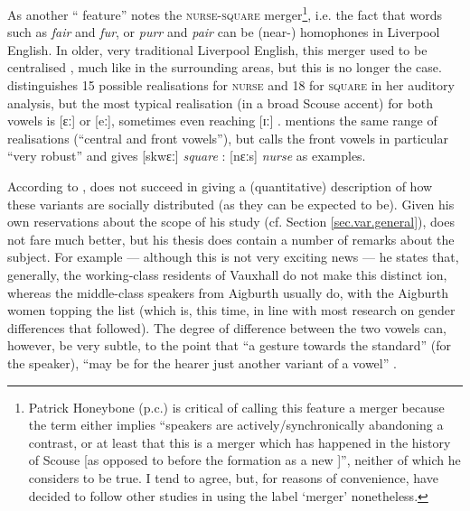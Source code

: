 As another `` feature'' \citet[72]{trudgill1999} notes the \textsc{nurse}-\textsc{square} merger\footnote{Patrick Honeybone (p.c.) is critical of calling this feature a merger because the term either implies \enquote{speakers are actively/synchronically abandoning a contrast, or at least that this is a merger which has happened in the history of Scouse [as opposed to before the formation as a new ]}, neither of which he considers to be true. I tend to agree, but, for reasons of convenience, have decided to follow other studies \parencite{trudgill1999,watsonclark2013} in using the label \enquote*{merger} nonetheless.}, i.e. the fact that words such as \emph{fair} and \emph{fur}, or \emph{purr} and \emph{pair} can be (near-) homophones in Liverpool English.
In older, very traditional Liverpool English, this merger used to be centralised \parencite[cf.][323]{west2015}, much like in the surrounding areas, but this is no longer the case.
\citet[cf.][68 and 71]{delyon1981} distinguishes 15 possible realisations for \textsc{nurse} and 18 for \textsc{square} in her auditory analysis, but the most typical realisation (in a broad Scouse accent) for both vowels is [ɛː] or [eː], sometimes even reaching [ɪː] \citep[cf.][358]{watson2007}.
\citet[127]{honeybone2007} mentions the same range of realisations (``central and front vowels''), but calls the front vowels in particular ``very robust'' and gives [skwɛː] \emph{square} : [nɛːs] \emph{nurse} as examples.

According to \citet[358]{watson2007}, \textcite{delyon1981} does not succeed in giving a (quantitative) description of how these variants are socially distributed (as they can be expected to be).
Given his own reservations about the scope of his study (cf. Section \ref{sec.var.general}), \citet{knowles1973} does not fare much better, but his thesis does contain a number of remarks about the subject.
For example --- although this is not very exciting news --- he states that, generally, the working-class residents of Vauxhall do not make this distinct ion, whereas the middle-class speakers from Aigburth usually do, with the Aigburth women topping the list (which is, this time, in line with most research on gender differences that followed).
The degree of difference between the two vowels can, however, be very subtle, to the point that ``a gesture towards the  standard'' (for the speaker), ``may be for the hearer just another variant of a  vowel'' \citep[cf.][295--297]{knowles1973}.

